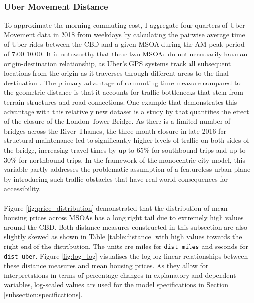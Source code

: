 \documentclass{article}
\begin{document}
\subsubsection{Uber Movement Distance}
To approximate the morning commuting cost, I aggregate four quarters of Uber Movement data \citep{UberMovement2019MovementCities} in 2018 from weekdays by calculating the pairwise average time of Uber rides between the CBD and a given MSOA during the AM peak period of 7:00-10:00. It is noteworthy that these two MSOAs do not necessarily have an origin-destination relationship, as Uber's GPS systems track all subsequent locations from the origin as it traverses through different areas to the final destination \citep{UberMovementUberMethodology}. The primary advantage of commuting time measure compared to the geometric distance is that it accounts for traffic bottlenecks that stem from terrain structures and road connections. One example that demonstrates this advantage with this relatively new dataset is a study by \citet{UberMovementTeam2018ExaminingClosure} that quantifies the effect of the closure of the London Tower Bridge. As there is a limited number of bridges across the River Thames, the three-month closure in late 2016 for structural maintenance led to significantly higher levels of traffic on both sides of the bridge, increasing travel times by up to 65\% for southbound trips and up to 30\% for northbound trips. In the framework of the monocentric city model, this variable partly addresses the problematic assumption of a featureless urban plane by introducing such traffic obstacles that have real-world consequences for accessibility.\\\\
Figure \ref{fig:price_distribution} demonstrated that the distribution of mean housing prices across MSOAs has a long right tail due to extremely high values around the CBD. Both distance measures constructed in this subsection are also slightly skewed as shown in Table \ref{table:distance} with high values towards the right end of the distribution. The units are miles for \texttt{dist\_miles} and seconds for \texttt{dist\_uber}. Figure \ref{fig:log_log} visualises the log-log linear relationships between these distance measures and mean housing prices. As they allow for interpretations in terms of percentage changes in explanatory and dependent variables, log-scaled values are used for the model specifications in Section \ref{subsection:specifications}.
\end{document}
